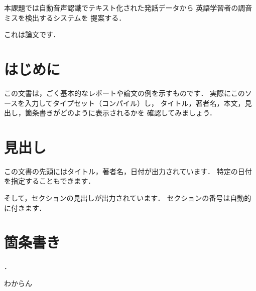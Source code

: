 本課題では自動音声認識でテキスト化された発話データから
英語学習者の調音ミスを検出するシステムを 提案する．

これは論文です．

\section{はじめに}

この文書は，ごく基本的なレポートや論文の例を示すものです．
実際にこのソースを入力してタイプセット（コンパイル）し，
タイトル，著者名，本文，見出し，箇条書きがどのように表示されるかを
確認してみましょう．

\section{見出し}

この文書の先頭にはタイトル，著者名，日付が出力されています．
特定の日付を指定することもできます．

そして，セクションの見出しが出力されています．
セクションの番号は自動的に付きます．

\section{箇条書き}


\cite{kato1985,yoshida2008,nakatani2009}．

わからん

\newpage
